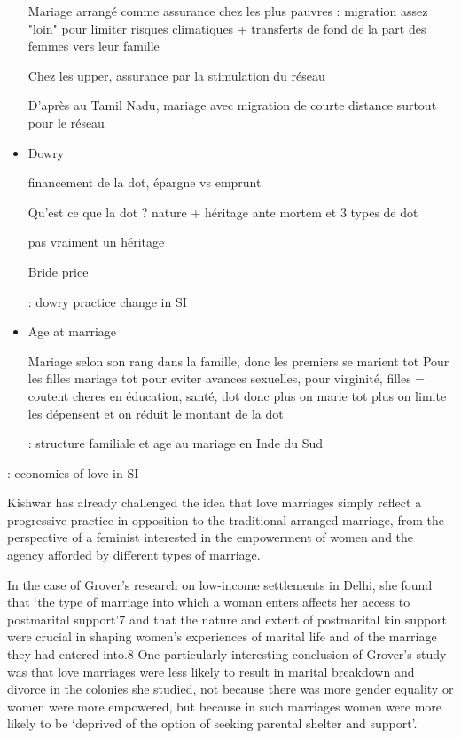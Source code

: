\documentclass[a4paper, 11pt, onecolumn]{article}
\begin{document}
\begin{itemize}
Mariage arrangé comme assurance chez les plus pauvres : migration assez "loin" pour limiter risques climatiques \cite{Rosenzweig1989} + transferts de fond de la part des femmes vers leur famille \cite{Bélanger2011}

Chez les upper, assurance par la stimulation du réseau \cite{Munshi2009}

D'après \cite{Jejeebhoy2005} au Tamil Nadu, mariage avec migration de courte distance surtout pour le réseau

\item Dowry

financement de la dot, épargne vs emprunt \cite{Caldwell1983, Corno2016}

Qu'est ce que la dot ? nature \cite{Caplan1984} + héritage ante mortem et 3 types de dot \cite{Tambiah1989} 

\cite{Dalmia2005} pas vraiment un héritage

Bride price \cite{Dalmia2005}

\cite{Srinivasan2005} : dowry practice change in SI



\item Age at marriage

Mariage selon son rang dans la famille, donc les premiers se marient tot \cite{Field2008}
Pour les filles mariage tot pour eviter avances sexuelles, pour virginité, filles = coutent cheres en éducation, santé, dot donc plus on marie tot plus on limite les dépensent et on réduit le montant de la dot \cite{Jensen2003}

\cite{Reddy1991} : structure familiale et age au mariage en Inde du Sud



\end{itemize}






\cite{DeNeve2016} : economies of love in SI

Kishwar has already challenged the idea that love marriages
simply reflect a progressive practice in opposition to the traditional
arranged marriage, from the perspective of a feminist interested in
the empowerment of women and the agency afforded by different
types of marriage.

In the case of Grover’s
research on low-income settlements in Delhi, she found that ‘the
type of marriage into which a woman enters affects her access to
postmarital support’7 and that the nature and extent of postmarital
kin support were crucial in shaping women’s experiences of marital life and of the marriage they had entered into.8 One particularly
interesting conclusion of Grover’s study was that love marriages were
less likely to result in marital breakdown and divorce in the colonies
she studied, not because there was more gender equality or women
were more empowered, but because in such marriages women were
more likely to be ‘deprived of the option of seeking parental shelter
and support’.
\end{document}
